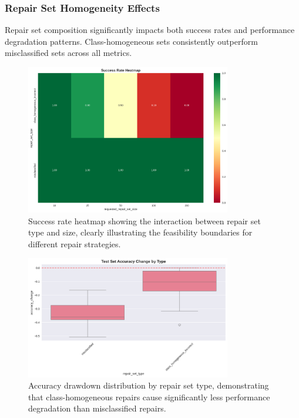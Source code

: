 \documentclass{article}
\begin{document}
\subsubsection{Repair Set Homogeneity Effects}

Repair set composition significantly impacts both success rates and performance degradation patterns. Class-homogeneous sets consistently outperform misclassified sets across all metrics.

\begin{figure}[h]
	\centering
	\includegraphics[width=0.8\textwidth]{results/one_shot_analysis/success_rates/success_rate_heatmap.png}
	\caption{Success rate heatmap showing the interaction between repair set type and size, clearly illustrating the feasibility boundaries for different repair strategies.}
	\label{fig:success_rate_heatmap}
\end{figure}

\begin{figure}[h]
	\centering
	\includegraphics[width=0.8\textwidth]{results/one_shot_analysis/accuracy/accuracy_change_by_type.png}
	\caption{Accuracy drawdown distribution by repair set type, demonstrating that class-homogeneous repairs cause significantly less performance degradation than misclassified repairs.}
	\label{fig:accuracy_change_by_type}
\end{figure}
\end{document}
